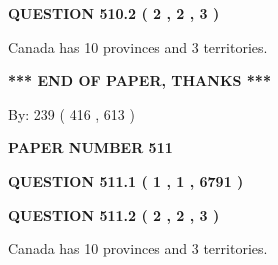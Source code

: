 \documentclass[12pt]{article}
\begin{document}
\vspace{0.2in}
  
{\textbf{\Large{QUESTION
510.2 
 ( 2 , 2 , 3 )
}}}
  
  
 
 
\noindent{}
 
 
Canada has 10  provinces and 3 territories.
 
 
 
 
   
   
 \vspace{0.2in}
 
   
   
   
   
\vspace{1.0in} 
{\textbf{\large{ *** END OF PAPER, THANKS *** }}} 
   
   
\hspace{1.0in} By: 
 239 ( 416 ,  613 )
   
   
   
   
\newpage 
\setcounter{page}{ 
   511001 } 
   
   
   
   
 {\textbf{ \Large{ PAPER NUMBER  511  }}}
   
   
\vspace{0.2in}
   
   
   
   
   
   
 \vspace{0.2in}
 
 
 
 
   
   
  
\vspace{0.2in}
  
{\textbf{\Large{QUESTION
511.1 
 ( 1 , 1 , 6791 )
}}}
  
  
  
\vspace{0.2in}
  
{\textbf{\Large{QUESTION
511.2 
 ( 2 , 2 , 3 )
}}}
  
  
 
 
\noindent{}
 
 
Canada has 10  provinces and 3 territories.
 
\end{document}
